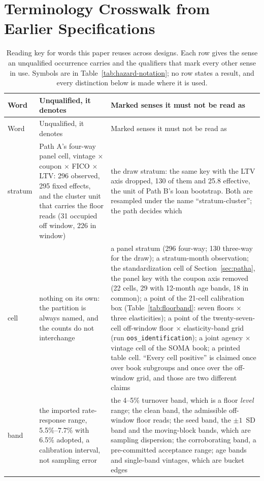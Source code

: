 \documentclass[12pt]{article}
\begin{document}



\section{Terminology Crosswalk from Earlier Specifications}\label{app:terminology-ledger}

{\footnotesize
\begin{longtable}{@{}p{1.5cm}p{6.2cm}p{6.2cm}@{}}
\caption{Reading key for words this paper reuses across designs. Each row gives the sense an unqualified occurrence carries and the qualifiers that mark every other sense in use. Symbols are in Table~\ref{tab:hazard-notation}; no row states a result, and every distinction below is made where it is used.}
\label{tab:terminology}\\
\toprule
Word & Unqualified, it denotes & Marked senses it must not be read as \\
\midrule
\endfirsthead
\toprule
Word & Unqualified, it denotes & Marked senses it must not be read as \\
\midrule
\endhead
stratum & Path A's four-way panel cell, vintage $\times$ coupon $\times$ FICO $\times$ LTV: 296 observed, 295 fixed effects, and the cluster unit that carries the floor reads (31 occupied off window, 226 in window) & the draw stratum: the same key with the LTV axis dropped, 130 of them and 25.8 effective, the unit of Path B's loan bootstrap. Both are resampled under the name ``stratum-cluster''; the path decides which \\
cell & nothing on its own: the partition is always named, and the counts do not interchange & a panel stratum (296 four-way; 130 three-way for the draw); a stratum-month observation; the standardization cell of Section~\ref{sec:patha}, the panel key with the coupon axis removed (22 cells, 29 with 12-month age bands, 18 in common); a point of the 21-cell calibration box (Table~\ref{tab:floorband}: seven floors $\times$ three elasticities); a point of the twenty-seven-cell off-window floor $\times$ elasticity-band grid (run \texttt{oos\_identification}); a joint agency $\times$ vintage cell of the SOMA book; a printed table cell. ``Every cell positive'' is claimed once over book subgroups and once over the off-window grid, and those are two different claims \\
band & the imported rate-response range, 5.5\%--7.7\% with 6.5\% adopted, a calibration interval, not sampling error & the 4--5\% turnover band, which is a floor \emph{level} range; the clean band, the admissible off-window floor reads; the seed band, the $\pm 1$~SD band and the moving-block bands, which are sampling dispersion; the corroborating band, a pre-committed acceptance range; age bands and single-band vintages, which are bucket edges \\

\end{longtable}}
\end{document}
